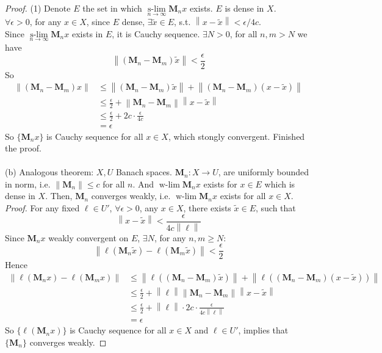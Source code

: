 \documentclass[a4paper, 10pt]{article}
\theoremstyle{definition}
\DeclareMathOperator{\wlim}{w-lim}
\DeclareMathOperator{\slim}{s-lim}
\theoremstyle{hSol}
\begin{document}
\begin{proof} (1) Denote $E$ the set in which $\slim\limits_{n\rightarrow\infty} \bm{M}_n x$ exists. $E$ is dense in $X$. \\
$\forall \epsilon>0$, for any $x\in X$, since $E$ dense, $\exists \tilde{x}\in E$, s.t. $\left\|x-\tilde{x}\right\|<\epsilon/4c$. \\
Since $\slim\limits_{n\rightarrow\infty}\bm{M}_n x$ exists in $E$, it is Cauchy sequence. $\exists N >0$, for all $n,m>N$ we have
$$
\left\|(\bm{M}_n- \bm{M}_m)\tilde{x}\right\| < \frac{\epsilon}{2}
$$
So
\begin{equation}
	\begin{split}
		\left\|(\bm{M}_n - \bm{M}_m)x\right\| &\leq \left\|(\bm{M}_n - \bm{M}_m)\tilde{x}\right\| + \left\|(\bm{M}_n - \bm{M}_m)(x-\tilde{x})\right\| \\
		&\leq \frac{\epsilon}{2} + \left\|\bm{M}_n - \bm{M}_m\right\|\left\|x-\tilde{x}\right\| \\
		&\leq \frac{\epsilon}{2} + 2c \cdot \frac{\epsilon}{4c} \\
		& = \epsilon
	\end{split}
\end{equation}
So $\{\bm{M}_nx\}$ is Cauchy sequence for all $x\in X$, which stongly convergent. Finished the proof. \\

~\\
(b) Analogous theorem: $X,U$ Banach spaces. $\bm{M}_n: X \to U$, are uniformly bounded in norm, i.e. $\left\|\bm{M}_n\right\|\leq c$ for all $n$. And $\wlim\limits_{}\bm{M}_n x$ exists for $x\in E$ which is dense in $X$. Then, $\bm{M}_n$ converges weakly, i.e. $\wlim\limits_{}\bm{M}_n x$ exists for all $x\in X$. \\
\textit{Proof.} For any fixed $\ell \in U'$, $\forall \epsilon>0$, any $x\in X$, there exists $\tilde{x}\in E$, such that
$$
\left\|x - \tilde{x}\right\| < \frac{\epsilon}{4c \left\|\ell\right\|}
$$
Since $\bm{M}_n x$ weakly convergent on $E$, $\exists N$, for any $n,m\geq N$:
$$
\left\|\ell(\bm{M}_n\tilde{x})-\ell(\bm{M}_m\tilde{x})\right\| < \frac{\epsilon}{2}
$$
Hence
\begin{equation}
	\begin{split}
		\left\|\ell(\bm{M}_n x)-\ell(\bm{M}_m x)\right\| &\leq \left\|\ell((\bm{M}_n-\bm{M}_m)\tilde{x})\right\| + \left\|\ell((\bm{M}_n-\bm{M}_m)(x-\tilde{x}))\right\|  \\
		&\leq \frac{\epsilon}{2} + \left\|\ell\right\| \left\|\bm{M}_n-\bm{M}_m\right\| \left\|x-\tilde{x}\right\| \\
		&\leq \frac{\epsilon}{2} + \left\|\ell\right\|\cdot 2c\cdot\frac{\epsilon}{4c \left\|\ell\right\|} \\
		&= \epsilon
 	\end{split}
\end{equation}
So $\{\ell(\bm{M}_nx)\}$ is Cauchy sequence for all $x\in X$ and $\ell \in U'$, implies that $\{\bm{M}_n\}$ converges weakly.
\end{proof}
\end{document}
